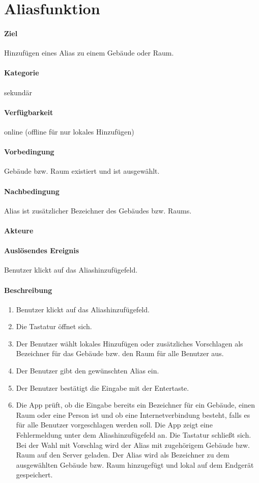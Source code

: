 \section{Aliasfunktion}
\paragraph{Ziel}
Hinzufügen eines Alias zu einem Gebäude oder Raum.
\paragraph{Kategorie}
sekundär
\paragraph{Verfügbarkeit}
online (offline für nur lokales Hinzufügen)
\paragraph{Vorbedingung}
Gebäude bzw. Raum existiert und ist ausgewählt.
\paragraph{Nachbedingung}
Alias ist zusätzlicher Bezeichner des Gebäudes bzw. Raums.
\paragraph{Akteure}

\paragraph{Auslösendes Ereignis}
Benutzer klickt auf das Aliashinzufügefeld.
\paragraph{Beschreibung}
\begin{enumerate}
    \item Benutzer klickt auf das Aliashinzufügefeld.
    \item Die Tastatur öffnet sich.
    \item Der Benutzer wählt lokales Hinzufügen oder zusätzliches Vorschlagen als Bezeichner für das Gebäude bzw. den Raum für alle Benutzer aus.
    \item Der Benutzer gibt den gewünschten Alias ein.
    \item Der Benutzer bestätigt die Eingabe mit der Entertaste.
    \item Die App prüft, ob die Eingabe bereits ein Bezeichner für ein Gebäude, einen Raum oder eine Person ist und ob eine Internetverbindung besteht, falls es für alle Benutzer vorgeschlagen werden soll.
     Die App zeigt eine Fehlermeldung unter dem Aliashinzufügefeld an.
     Die Tastatur schließt sich.
    \subitem Bei der Wahl mit Vorschlag wird der Alias mit zugehörigem Gebäude bzw. Raum auf den Server geladen.
    \subitem Der Alias wird als Bezeichner zu dem ausgewählten Gebäude bzw. Raum hinzugefügt und lokal auf dem Endgerät gespeichert.
\end{enumerate}